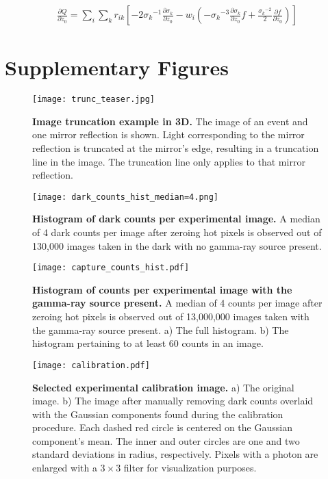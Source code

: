 \documentclass{article}
\begin{document}
\begin{align}
\frac{\partial Q}{\partial z_0} = \sum_i \sum_k r_{ik} \left[ -2{\sigma_k}^{-1}\frac{\partial \sigma_k}{\partial z_0} - w_i\left( -{\sigma_k}^{-3} \frac{\partial \sigma_k}{\partial z_0}f + \frac{{\sigma_k}^{-2}}{2} \frac{\partial f}{\partial z_0}  \right) \right] 
\end{align}



\section{Supplementary Figures}

\begin{figure}
\centering
\texttt{[image: trunc\_teaser.jpg]}
\caption{\textbf{Image truncation example in 3D.}
The image of an event and one mirror reflection is shown. 
Light corresponding to the mirror reflection is truncated at the mirror's edge, 
resulting in a truncation line in the image.
The truncation line only applies to that mirror reflection.}
\label{fig:trunc_teaser}
\end{figure}

\begin{figure}
\centering
\texttt{[image: dark\_counts\_hist\_median=4.png]}
\caption{\textbf{Histogram of dark counts per experimental image.} 
A median of 4 dark counts per image after zeroing hot pixels is observed out of 
130,000 images taken in the dark with no gamma-ray source present.} 
\label{fig:dark_counts_hist}
\end{figure}


\begin{figure}
\centering
\texttt{[image: capture\_counts\_hist.pdf]}
\caption{\textbf{Histogram of counts per experimental image with the gamma-ray source present.} A median of 4 counts 
per image after zeroing hot pixels is observed out of 13,000,000 images taken with 
the gamma-ray source present. 
a) The full histogram. 
b) The histogram pertaining to at least 60 counts in an image.} 
\label{fig:cap_counts_hist}
\end{figure}


\begin{figure*}
\centering
\texttt{[image: calibration.pdf]}
\caption{\textbf{Selected experimental calibration image.} a) The original image. b) The image after manually 
removing dark counts overlaid with the Gaussian components found during the 
calibration procedure.
Each dashed red circle is centered on the Gaussian component's mean. 
The inner and outer circles are one and two standard deviations in radius, respectively.
Pixels with a photon are enlarged with a $3 \times 3$ filter for visualization purposes.
} 
\label{fig:calibration}
\end{figure*}
\end{document}
